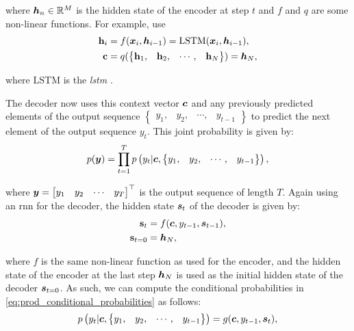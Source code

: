 where $\hvect_n \in \reals{M}$ is the hidden state of the encoder at step $t$ and $f$ and $q$ are some non-linear functions. For example, \citet{sutskever2014sequence} use
\begin{align*}
    \hvect_i &= f(\xvect_i, \hvect_{i-1}) = \text{LSTM}(\xvect_i, \hvect_{i-1}), \\
    \cvect &= q(\begin{Bmatrix} \hvect_1, & \hvect_2, & \cdots, & \hvect_N \end{Bmatrix}) = \hvect_N,
\end{align*}

where $\text{LSTM}$ is the \emph{\glsdesc{lstm}} \citep{hochreiter1997long}. 

The decoder now uses this context vector $\cvect$ and any previously predicted elements of the output sequence $\begin{Bmatrix} y_1, & y_2, & \cdots, & y_{t-1} \end{Bmatrix}$ to predict the next element of the output sequence $y_{t}$. This joint probability is given by:
\begin{align}
    \label{eq:prod_conditional_probabilities}
    p(\yvect) = \prod_{t=1}^{T} p\left(y_{t} | \cvect, \begin{Bmatrix} y_1, & y_2, & \cdots, & y_{t-1} \end{Bmatrix} \right),
\end{align}

where $\yvect = \begin{bmatrix} y_1 & y_2 & \cdots & y_{T} \end{bmatrix}^{\top}$ is the output sequence of length $T$. Again using an \gls{rnn} for the decoder, the hidden state $\svect_{t}$ of the decoder is given by:
\begin{align}
    \label{eq:conventional_decoder_hidden_state}
    \svect_{t} &= f(\cvect, y_{t-1}, \svect_{t-1}), \\
    \svect_{t=0} &= \hvect_N,
\end{align}

where $f$ is the same non-linear function as used for the encoder, and the hidden state of the encoder at the last step $\hvect_N$ is used as the initial hidden state of the decoder $\svect_{t=0}$. As such, we can compute the conditional probabilities in \cref{eq:prod_conditional_probabilities} as follows:
\begin{align}
    \label{eq:conventional_conditional_probability}
    p\left( y_{t} | \cvect, \begin{Bmatrix} y_1, & y_2, & \cdots, & y_{t-1} \end{Bmatrix} \right) = g(\cvect, y_{t-1}, \svect_{t}),
\end{align}

